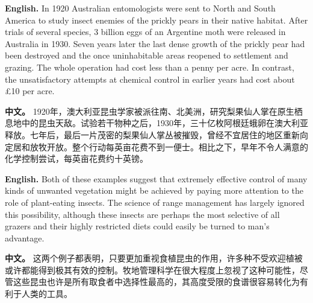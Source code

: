 \noindent\textbf{English.} In 1920 Australian entomologists were sent to North and South America to study insect enemies of the prickly pears in their native habitat. After trials of several species, 3 billion eggs of an Argentine moth were released in Australia in 1930. Seven years later the last dense growth of the prickly pear had been destroyed and the once uninhabitable areas reopened to settlement and grazing. The whole operation had cost less than a penny per acre. In contrast, the unsatisfactory attempts at chemical control in earlier years had cost about \pounds 10 per acre.
\par
\noindent\textbf{中文。} 1920年，澳大利亚昆虫学家被派往南、北美洲，研究梨果仙人掌在原生栖息地中的昆虫天敌。试验若干物种之后，1930年，三十亿枚阿根廷蛾卵在澳大利亚释放。七年后，最后一片茂密的梨果仙人掌丛被摧毁，曾经不宜居住的地区重新向定居和放牧开放。整个行动每英亩花费不到一便士。相比之下，早年不令人满意的化学控制尝试，每英亩花费约十英镑。
\par\medskip

\noindent\textbf{English.} Both of these examples suggest that extremely effective control of many kinds of unwanted vegetation might be achieved by paying more attention to the role of plant-eating insects. The science of range management has largely ignored this possibility, although these insects are perhaps the most selective of all grazers and their highly restricted diets could easily be turned to man's advantage.
\par
\noindent\textbf{中文。} 这两个例子都表明，只要更加重视食植昆虫的作用，许多种不受欢迎植被或许都能得到极其有效的控制。牧地管理科学在很大程度上忽视了这种可能性，尽管这些昆虫也许是所有取食者中选择性最高的，其高度受限的食谱很容易转化为有利于人类的工具。
\par
